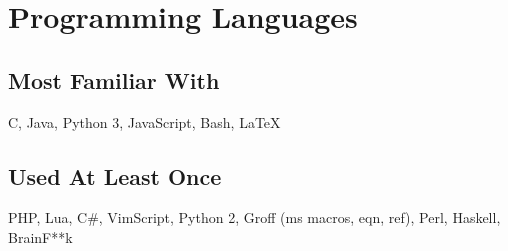 \documentclass[9pt]{extarticle}
\begin{document}
    \section{Programming Languages}
    \subsection{Most Familiar With}
    C, Java, Python 3, JavaScript, Bash, \LaTeX
    \subsection{Used At Least Once}
    PHP, Lua, C\#, VimScript, Python 2, Groff (ms macros, eqn, ref), Perl, Haskell, BrainF**k
\end{document}
